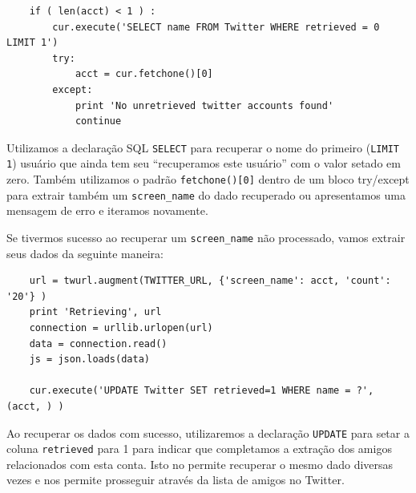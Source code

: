 \beforeverb
\begin{verbatim}
    if ( len(acct) < 1 ) :
        cur.execute('SELECT name FROM Twitter WHERE retrieved = 0 LIMIT 1')
        try:
            acct = cur.fetchone()[0]
        except:
            print 'No unretrieved twitter accounts found'
            continue
\end{verbatim}
\afterverb
%

Utilizamos a declaração SQL {\tt SELECT} para recuperar o nome do primeiro
({\tt LIMIT 1}) usuário que ainda tem seu ``recuperamos este usuário'' com o
valor setado em zero. Também utilizamos o padrão {\tt fetchone()[0]} dentro de
um bloco try/except para extrair também um \verb"screen_name" do dado
recuperado ou apresentamos uma mensagem de erro e iteramos novamente.


Se tivermos sucesso ao recuperar um \verb"screen_name" não processado, vamos
extrair seus dados da seguinte maneira:

\beforeverb
\begin{verbatim}
    url = twurl.augment(TWITTER_URL, {'screen_name': acct, 'count': '20'} )
    print 'Retrieving', url
    connection = urllib.urlopen(url)
    data = connection.read()
    js = json.loads(data)

    cur.execute('UPDATE Twitter SET retrieved=1 WHERE name = ?', (acct, ) )
\end{verbatim}
\afterverb
%
%
Ao recuperar os dados com sucesso, utilizaremos a declaração {\tt UPDATE} para
setar a coluna {\tt retrieved} para 1 para indicar que completamos a extração
dos amigos relacionados com esta conta. Isto no permite recuperar o mesmo dado
diversas vezes e nos permite prosseguir através da lista de amigos no Twitter. 


